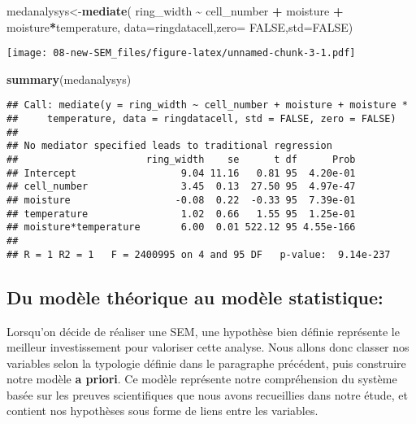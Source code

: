 \documentclass[
]{article}
\newenvironment{Shaded}{\begin{snugshade}}{\end{snugshade}}
\newcommand{\AttributeTok}[1]{\textcolor[rgb]{0.13,0.29,0.53}{#1}}
\newcommand{\ConstantTok}[1]{\textcolor[rgb]{0.56,0.35,0.01}{#1}}
\newcommand{\FunctionTok}[1]{\textcolor[rgb]{0.13,0.29,0.53}{\textbf{#1}}}
\newcommand{\NormalTok}[1]{#1}
\newcommand{\OtherTok}[1]{\textcolor[rgb]{0.56,0.35,0.01}{#1}}
\newcommand{\SpecialCharTok}[1]{\textcolor[rgb]{0.81,0.36,0.00}{\textbf{#1}}}
\begin{document}
\begin{Shaded}
\begin{Highlighting}[]
\NormalTok{medanalysys}\OtherTok{\textless{}{-}}\FunctionTok{mediate}\NormalTok{( ring\_width }\SpecialCharTok{\textasciitilde{}}\NormalTok{   cell\_number  }\SpecialCharTok{+}\NormalTok{ moisture }\SpecialCharTok{+}\NormalTok{ moisture}\SpecialCharTok{*}\NormalTok{temperature, }
                      \AttributeTok{data=}\NormalTok{ringdatacell,}\AttributeTok{zero=} \ConstantTok{FALSE}\NormalTok{,}\AttributeTok{std=}\ConstantTok{FALSE}\NormalTok{)}
\end{Highlighting}
\end{Shaded}

\texttt{[image: 08-new-SEM\_files/figure-latex/unnamed-chunk-3-1.pdf]}

\begin{Shaded}
\begin{Highlighting}[]
\FunctionTok{summary}\NormalTok{(medanalysys)}
\end{Highlighting}
\end{Shaded}

\begin{verbatim}
## Call: mediate(y = ring_width ~ cell_number + moisture + moisture * 
##     temperature, data = ringdatacell, std = FALSE, zero = FALSE)
## 
## No mediator specified leads to traditional regression 
##                      ring_width    se      t df      Prob
## Intercept                  9.04 11.16   0.81 95  4.20e-01
## cell_number                3.45  0.13  27.50 95  4.97e-47
## moisture                  -0.08  0.22  -0.33 95  7.39e-01
## temperature                1.02  0.66   1.55 95  1.25e-01
## moisture*temperature       6.00  0.01 522.12 95 4.55e-166
## 
## R = 1 R2 = 1   F = 2400995 on 4 and 95 DF   p-value:  9.14e-237
\end{verbatim}

\hypertarget{du-moduxe8le-thuxe9orique-au-moduxe8le-statistique}{%
\subsection{Du modèle théorique au modèle
statistique:}\label{du-moduxe8le-thuxe9orique-au-moduxe8le-statistique}}

Lorsqu'on décide de réaliser une SEM, une hypothèse bien définie
représente le meilleur investissement pour valoriser cette analyse. Nous
allons donc classer nos variables selon la typologie définie dans le
paragraphe précédent, puis construire notre modèle \textbf{a priori}. Ce
modèle représente notre compréhension du système basée sur les preuves
scientifiques que nous avons recueillies dans notre étude, et contient
nos hypothèses sous forme de liens entre les variables.
\end{document}
